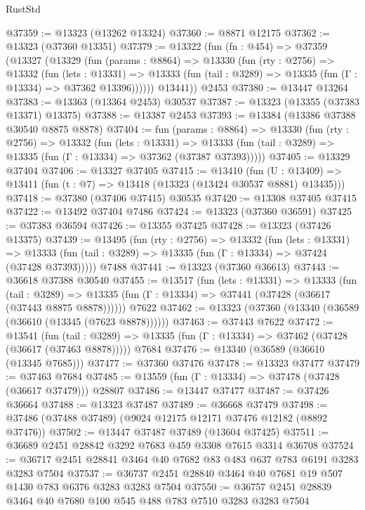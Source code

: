 \begin{lexlean}{RustStd}
\begin{coremodule}
@37359 := @13323 (@13262 @13324)
@37360 := @8871 @12175
@37362 := @13323 (@37360 @13351)
@37379 := @13322
    (fun (fn : @454) =>
    @37359
      (@13327
        (@13329
          (fun (params : @8864) =>
          @13330
            (fun (rty : @2756) =>
            @13332
              (fun (lets : @13331) =>
              @13333 (fun (tail : @3289) => @13335 (fun (Γ : @13334) => @37362 @13396))))))
        @13441))
    @2453
@37380 := @13447 @13264
@37383 := @13363 (@13364 @2453) @30537
@37387 := @13323 (@13355 (@37383 @13371) @13375)
@37388 := @13387 @2453
@37393 := @13384 (@13386 @37388 @30540 @8875 @8878)
@37404 := fun (params : @8864) =>
  @13330
    (fun (rty : @2756) =>
    @13332
      (fun (lets : @13331) =>
      @13333 (fun (tail : @3289) => @13335 (fun (Γ : @13334) => @37362 (@37387 @37393)))))
@37405 := @13329 @37404
@37406 := @13327 @37405
@37415 := @13410
    (fun (U : @13409) => @13411 (fun (t : @7) => @13418 (@13323 (@13424 @30537 @8881) @13435)))
@37418 := @37380 (@37406 @37415) @30535
@37420 := @13308 @37405 @37415
@37422 := @13492 @37404 @7486
@37424 := @13323 (@37360 @36591)
@37425 := @37383 @36594
@37426 := @13355 @37425
@37428 := @13323 (@37426 @13375)
@37439 := @13495
    (fun (rty : @2756) =>
    @13332
      (fun (lets : @13331) =>
      @13333 (fun (tail : @3289) => @13335 (fun (Γ : @13334) => @37424 (@37428 @37393)))))
    @7488
@37441 := @13323 (@37360 @36613)
@37443 := @36618 @37388 @30540
@37455 := @13517
    (fun (lets : @13331) =>
    @13333
      (fun (tail : @3289) =>
      @13335 (fun (Γ : @13334) => @37441 (@37428 (@36617 (@37443 @8875 @8878))))))
    @7622
@37462 := @13323 (@37360 (@13340 (@36589 (@36610 (@13345 (@7623 @8878))))))
@37463 := @37443 @7622
@37472 := @13541
    (fun (tail : @3289) => @13335 (fun (Γ : @13334) => @37462 (@37428 (@36617 (@37463 @8878)))))
    @7684
@37476 := @13340 (@36589 (@36610 (@13345 @7685)))
@37477 := @37360 @37476
@37478 := @13323 @37477
@37479 := @37463 @7684
@37485 := @13559 (fun (Γ : @13334) => @37478 (@37428 (@36617 @37479))) @28807
@37486 := @13447 @37477
@37487 := @37426 @36664
@37488 := @13323 @37487
@37489 := @36668 @37479
@37498 := @37486 (@37488 @37489) (@9024 @12175 @12171 @37476 @12182 (@8892 @37476))
@37502 := @13447 @37487 @37489 (@13604 @37425)
@37511 := @36689 @2451 @28842 @3292 @7683 @459 @3308 @7615 @3314 @36708
@37524 := @36717 @2451 @28841 @3464 @40 @7682 @83 @483 @637 @783 @6191 @3283 @3283 @7504
@37537 := @36737 @2451 @28840 @3464 @40 @7681 @19 @507 @1430 @783 @6376 @3283 @3283 @7504
@37550 := @36757 @2451 @28839 @3464 @40 @7680 @100 @545 @488 @783 @7510 @3283 @3283 @7504

\end{coremodule}
\end{lexlean}
